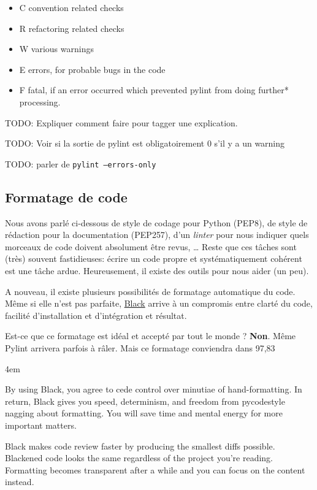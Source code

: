 \documentclass[11pt]{amsbook}
\renewenvironment{quotation}
{   \leftskip 4em \begin{em} }
{\end{em}\par }
\begin{document}
\begin{itemize}

\item C convention related checks

\item R refactoring related checks

\item W various warnings

\item E errors, for probable bugs in the code

\item F fatal, if an error occurred which prevented pylint from doing further* processing.

\end{itemize}


TODO: Expliquer comment faire pour tagger une explication.


TODO: Voir si la sortie de pylint est obligatoirement 0 s’il y a un warning


TODO: parler de \texttt{pylint --errors-only}


\hypertarget{x-formatage-de-code}{\subsection{Formatage de code}}
Nous avons parlé ci-dessous de style de codage pour Python (PEP8), de style de rédaction pour la documentation (PEP257), d’un \emph{linter} pour nous indiquer quels morceaux de code doivent absolument être revus, …​
Reste que ces tâches sont  (très) souvent fastidieuses: écrire un code propre et systématiquement cohérent est une tâche ardue.
Heureusement, il existe des outils pour nous aider (un peu).


A nouveau, il existe plusieurs possibilités de formatage automatique du code.
Même si elle n’est pas parfaite, \href{https://black.readthedocs.io/en/stable/}{Black} arrive à un compromis entre clarté du code, facilité d’installation et d’intégration et résultat.


Est-ce que ce formatage est idéal et accepté par tout le monde ?
\textbf{Non}. Même Pylint arrivera parfois à râler.
Mais ce formatage conviendra dans 97,83%


\begin{quotation}
By using Black, you agree to cede control over minutiae of hand-formatting. In return, Black gives you speed, determinism, and freedom from pycodestyle nagging about formatting. You will save time and mental energy for more important matters.


Black makes code review faster by producing the smallest diffs possible. Blackened code looks the same regardless of the project you’re reading. Formatting becomes transparent after a while and you can focus on the content instead.
\end{quotation}
\end{document}
